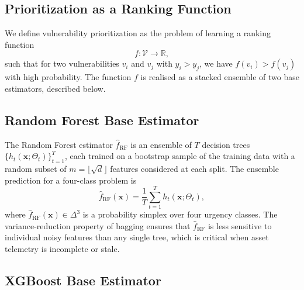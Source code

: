 \documentclass[review,12pt]{elsarticle}
\begin{document}
\subsection{Prioritization as a Ranking Function}

We define vulnerability prioritization as the problem of learning a ranking function
\begin{equation}
  f: \mathcal{V} \rightarrow \mathbb{R},
  \label{eq:ranking}
\end{equation}
such that for two vulnerabilities $v_i$ and $v_j$ with $y_i > y_j$, we have $f(v_i) > f(v_j)$ with high probability. The function $f$ is realised as a stacked ensemble of two base estimators, described below.

\subsection{Random Forest Base Estimator}

The Random Forest \citep{breiman2001} estimator $\hat{f}_{\text{RF}}$ is an ensemble of $T$ decision trees $\{h_t(\mathbf{x}; \Theta_t)\}_{t=1}^{T}$, each trained on a bootstrap sample of the training data with a random subset of $m = \lfloor\sqrt{d}\rfloor$ features considered at each split. The ensemble prediction for a four-class problem is
\begin{equation}
  \hat{f}_{\text{RF}}(\mathbf{x}) = \frac{1}{T} \sum_{t=1}^{T} h_t(\mathbf{x}; \Theta_t),
  \label{eq:rf}
\end{equation}
where $\hat{f}_{\text{RF}}(\mathbf{x}) \in \Delta^3$ is a probability simplex over four urgency classes. The variance-reduction property of bagging ensures that $\hat{f}_{\text{RF}}$ is less sensitive to individual noisy features than any single tree, which is critical when asset telemetry is incomplete or stale.

\subsection{XGBoost Base Estimator}
\end{document}
